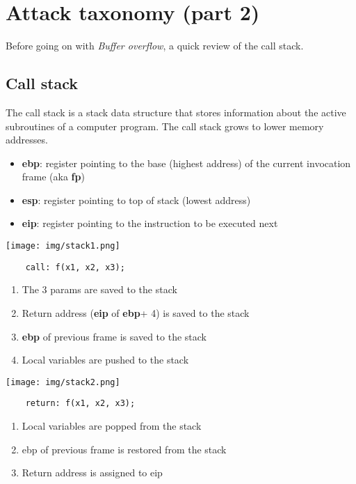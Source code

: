 \documentclass[a4paper, 10pt, titlepage]{article}
\begin{document}
	\section{Attack taxonomy (part 2)}
	Before going on with \textit{Buffer overflow}, a quick review of the call stack.
	\subsection{Call stack}
	The call stack is a stack data structure that stores information about the active subroutines of a computer program. The call stack grows to lower memory addresses.
	\begin{itemize}
	\item \textbf{ebp}: register pointing to the base (highest address) of the current invocation frame (aka \textbf{fp}) 
	\item \textbf{esp}: register pointing to top of stack (lowest address) 
	\item \textbf{eip}: register pointing to the instruction to be executed next
	\end{itemize} \medskip
	\begin{minipage}{0.35\textwidth}
	\texttt{[image: img/stack1.png]}
	\end{minipage}
	\begin{minipage}{0.6\textwidth}
\begin{verbatim}
	call: f(x1, x2, x3);
\end{verbatim}
\begin{enumerate}
\item The 3 params are saved to the stack
\item Return address (\textbf{eip} of \textbf{ebp}+ 4) is
saved to the stack
\item \textbf{ebp} of previous frame is saved to
the stack
\item Local variables are pushed to the
stack
\end{enumerate}
	\end{minipage}\medskip
	
	\begin{minipage}{0.32\textwidth}
	\texttt{[image: img/stack2.png]}
	\end{minipage}
	\begin{minipage}{0.6\textwidth}
\begin{verbatim}
	return: f(x1, x2, x3);
\end{verbatim}
\begin{enumerate}
\item Local variables are popped from
the stack
\item ebp of previous frame is restored
from the stack
\item Return address is assigned to eip
\end{enumerate}
\end{minipage}
\end{document}
